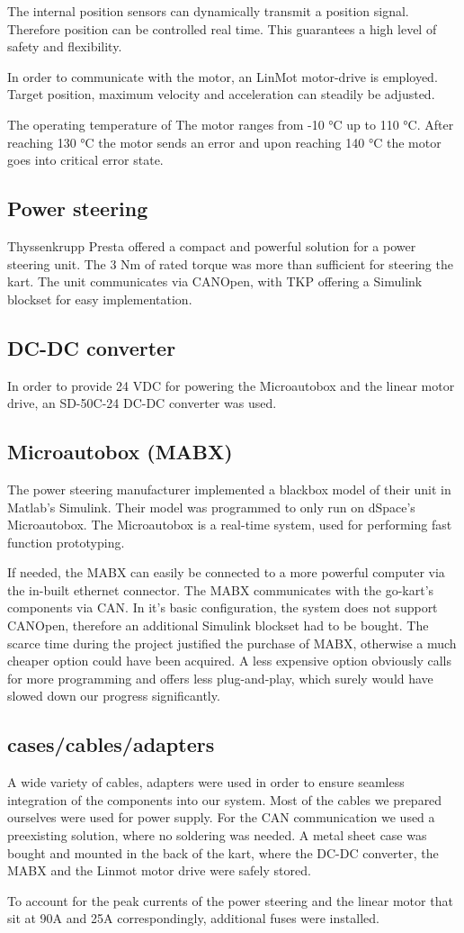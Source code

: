 The internal position sensors can dynamically transmit a position signal. Therefore position can be controlled real time. This guarantees a high level of safety and flexibility. 

In order to communicate with the motor, an LinMot motor-drive is employed. Target position, maximum velocity and acceleration can steadily be adjusted.

The operating temperature of The motor ranges from -10 °C up to 110 °C. After reaching 130 °C the motor sends an error and upon reaching 140 °C the motor goes into critical error state.


\subsection{Power steering}
Thyssenkrupp Presta offered a compact and powerful solution for a power steering unit. The 3 Nm of rated torque was more than sufficient for steering the kart. The unit communicates via CANOpen, with TKP offering a Simulink blockset for easy implementation. 

\subsection{DC-DC converter}
In order to provide 24 VDC for powering the Microautobox and the linear motor drive, an SD-50C-24 DC-DC converter was used.

\subsection{Microautobox (MABX)}
The power steering manufacturer implemented a blackbox model of their unit in Matlab's Simulink. Their model was programmed to only run on dSpace's Microautobox. The Microautobox is a real-time system, used for performing fast function prototyping.

If needed, the MABX can easily be connected to a more powerful computer via the in-built ethernet connector. The MABX communicates with the go-kart's components via CAN. In it's basic configuration, the system does not support CANOpen, therefore an additional Simulink blockset had to be bought. The scarce time during the project justified the purchase of MABX, otherwise a much cheaper option could have been acquired. A less expensive option obviously calls for more programming and offers less plug-and-play, which surely would have slowed down our progress significantly. 

\subsection{cases/cables/adapters}
A wide variety of cables, adapters were used in order to ensure seamless integration of the components into our system.
Most of the cables we prepared ourselves were used for power supply.
For the CAN communication we used a preexisting solution, where no soldering was needed.
A metal sheet case was bought and mounted in the back of the kart, where the DC-DC converter, the MABX and the Linmot motor drive were safely stored.

To account for the peak currents of the power steering and the linear motor that sit at 90A and 25A correspondingly, additional fuses were installed.